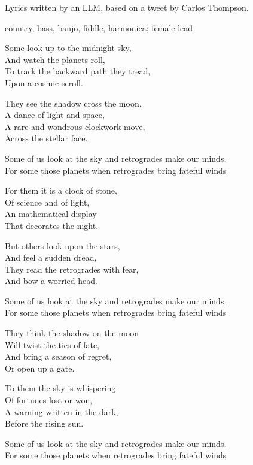 

\begin{notes}
Lyrics written by an LLM, based on a tweet by Carlos Thompson.
\end{notes}

\begin{style}
country, bass, banjo, fiddle, harmonica; female lead
\end{style}

\begin{lyrics}
Some look up to the midnight sky,\\
And watch the planets roll,\\
To track the backward path they tread,\\
Upon a cosmic scroll.

They see the shadow cross the moon,\\
A dance of light and space,\\
A rare and wondrous clockwork move,\\
Across the stellar face.

Some of us look at the sky and retrogrades make our minds.\\
For some those planets when retrogrades bring fateful winds

For them it is a clock of stone,\\
Of science and of light,\\
An mathematical display\\
That decorates the night.

But others look upon the stars,\\
And feel a sudden dread,\\
They read the retrogrades with fear,\\
And bow a worried head.

Some of us look at the sky and retrogrades make our minds.\\
For some those planets when retrogrades bring fateful winds

They think the shadow on the moon\\
Will twist the ties of fate,\\
And bring a season of regret,\\
Or open up a gate.

To them the sky is whispering\\
Of fortunes lost or won,\\
A warning written in the dark,\\
Before the rising sun.

Some of us look at the sky and retrogrades make our minds.\\
For some those planets when retrogrades bring fateful winds

\end{lyrics}

